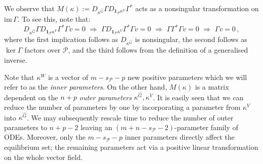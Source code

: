 \documentclass[11pt]{amsart}
\renewcommand{\k}{\kappa}
\newcommand{\wG}{\widehat{G}}
\newcommand{\mP}{\mathcal{P}}
\theoremstyle{definition}
\begin{document}
We observe that $M(\kappa):=D_{\k^{\wG}}\Gamma D_{\bm{1}_{\mP}\k^V} \Gamma^*$ acts as a nonsingular transformation on $\mathrm{im}\,\Gamma$. To see this, note that:
\[
D_{\k^{\wG}}\Gamma D_{\bm{1}_{\mP}\k^V} \Gamma^*\Gamma v = 0\,\,\Rightarrow\,\, \Gamma D_{\bm{1}_{\mP}\k^V} \Gamma^*\Gamma v = 0\,\,\Rightarrow\,\, \Gamma \Gamma^*\Gamma v =0 \,\,\Rightarrow\,\, \Gamma v =0\,,
\]
where the first implication follows as $D_{\k^{\wG}}$ is nonsingular, the second follows as $\ker \Gamma$ factors over $\mP$, and the third follows from the definition of a generalised inverse.

Note that $\k^W$ is a vector of $m-s_\mP-p$ new positive parameters which we will refer to as the {\em inner parameters}. On the other hand, $M(\kappa)$ is a matrix dependent on the $n+p$ {\em outer parameters} $\k^{\wG}, \k^V$. It is easily seen that we can reduce the number of parameters by one by incorporating a parameter from $\k^V$ into $\k^{\wG}$. We may subsequently rescale time to reduce the number of outer parameters to $n+p-2$ leaving an $(m+n-s_\mP-2)$-parameter family of ODEs. 
Moreover, only the $m-s_\mP-p$ inner parameters directly affect the equilibrium set; the remaining parameters act via a positive linear transformation on the whole vector field.
\end{document}
